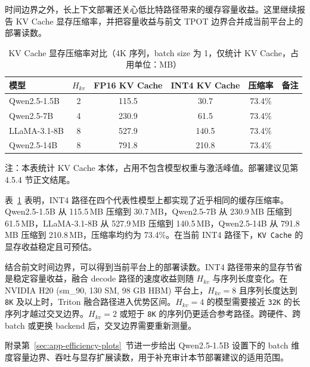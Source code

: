 时间边界之外，长上下文部署还关心低比特路径带来的缓存容量收益。这里继续报告 KV Cache 显存压缩率，并把容量收益与前文 TPOT 边界合并成当前平台上的部署读数。

\begin{table}[H]
  \centering
  \caption{KV Cache 显存压缩率对比（4K 序列，batch size 为 1，仅统计 KV Cache，占用单位：MB）}
  \label{tab:ch4-kvcache-memory}
  {%
  \footnotesize
  \setlength{\tabcolsep}{4pt}
  \renewcommand{\arraystretch}{1.05}
  \begin{tabular}{lccccc}
    \toprule
    模型 & $H_{kv}$ & FP16 KV Cache & INT4 KV Cache & 压缩率 & 备注 \\
    \midrule
    Qwen2.5-1.5B & 2 & 115.5 & 30.7  & 73.4\% & \\
    Qwen2.5-7B   & 4 & 230.9 & 61.5  & 73.4\% & \\
    LLaMA-3.1-8B & 8 & 527.9 & 140.5 & 73.4\% & \\
    Qwen2.5-14B  & 8 & 791.8 & 210.8 & 73.4\% & \\
    \bottomrule
  \end{tabular}

  \vspace{0.35em}
  \begin{minipage}{0.94\linewidth}
    \footnotesize
    注：本表统计 KV Cache 本体，占用不包含模型权重与激活峰值。部署建议见第 4.5.4 节正文结尾。
  \end{minipage}
  }
\end{table}

表~\ref{tab:ch4-kvcache-memory} 表明，INT4 路径在四个代表性模型上都实现了近乎相同的缓存压缩率。Qwen2.5-1.5B 从 115.5\,MB 压缩到 30.7\,MB，Qwen2.5-7B 从 230.9\,MB 压缩到 61.5\,MB，LLaMA-3.1-8B 从 527.9\,MB 压缩到 140.5\,MB，Qwen2.5-14B 从 791.8\,MB 压缩到 210.8\,MB，压缩率均约为 73.4\%。在当前 INT4 路径下，\texttt{KV Cache} 的显存收益稳定且可预估。

结合前文时间边界，可以得到当前平台上的部署读数。INT4 路径带来的显存节省是稳定容量收益，融合 decode 路径的速度收益则随 $H_{kv}$ 与序列长度变化。在 NVIDIA H20 (sm\_90, 130 SM, 98 GB HBM) 平台上，$H_{kv}=8$ 且序列长度达到 \texttt{8K} 及以上时，Triton 融合路径进入优势区间。$H_{kv}=4$ 的模型需要接近 \texttt{32K} 的长序列才越过交叉边界。$H_{kv}=2$ 或短于 \texttt{8K} 的序列仍更适合参考路径。跨硬件、跨 batch 或更换 backend 后，交叉边界需要重新测量。

附录第~\ref{sec:app-efficiency-plots}~节进一步给出 Qwen2.5-1.5B 设置下的 batch 维度容量边界、吞吐与显存扩展读数，用于补充审计本节部署建议的适用范围。


